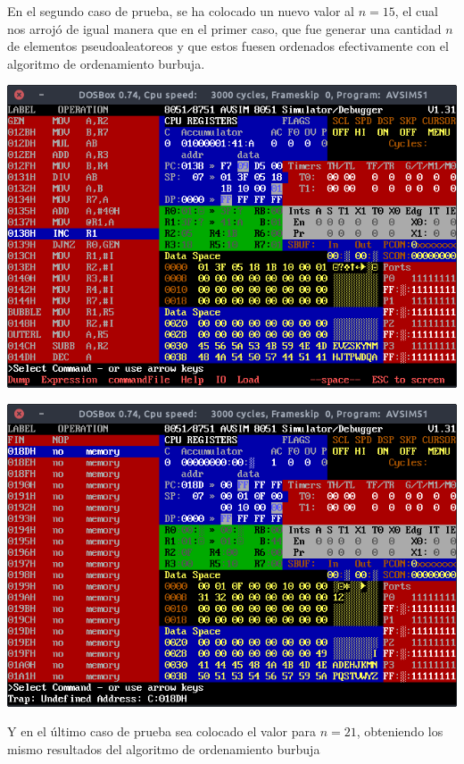 \documentclass[doc, donotrepeattitle, biblatex, apacite]{apa6}
\begin{document}
En el segundo caso de prueba, se ha colocado un nuevo valor al $n=15$, el cual nos arrojó de
igual manera que en el primer caso, que fue generar una cantidad $n$ de elementos pseudoaleatoreos y
que estos fuesen ordenados efectivamente con el algoritmo de ordenamiento burbuja.

\begin{center}
\includegraphics[scale=0.5]{icler6}

\includegraphics[scale=0.5]{icler7}
\end{center}

Y en el último caso de prueba sea colocado el valor para $n=21$, obteniendo los mismo resultados
del algoritmo de ordenamiento burbuja
\end{document}
